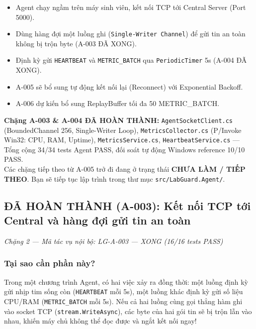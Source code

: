 \documentclass[12pt,a4paper]{article}
\begin{document}
\begin{summarybox}
\begin{itemize}[leftmargin=1.5em, itemsep=1pt]
  \item Agent chạy ngầm trên máy sinh viên, kết nối TCP tới Central Server (Port 5000).
  \item Dùng hàng đợi một luồng ghi (\texttt{Single-Writer Channel}) để gửi tin an toàn không bị trộn byte (A-003 ĐÃ XONG).
  \item Định kỳ gửi \texttt{HEARTBEAT} và \texttt{METRIC\_BATCH} qua \texttt{PeriodicTimer} 5s (A-004 ĐÃ XONG).
  \item A-005 sẽ bổ sung tự động kết nối lại (Reconnect) với Exponential Backoff.
  \item A-006 dự kiến bổ sung ReplayBuffer tối đa 50 METRIC\_BATCH.
\end{itemize}
\end{summarybox}

\begin{importantbox}
\textbf{Chặng A-003 \& A-004 ĐÃ HOÀN THÀNH:} \texttt{AgentSocketClient.cs} (BoundedChannel 256, Single-Writer Loop), \texttt{MetricsCollector.cs} (P/Invoke Win32: CPU, RAM, Uptime), \texttt{MetricsService.cs}, \texttt{HeartbeatService.cs} --- Tổng cộng 34/34 tests Agent PASS, đối soát tự động Windows reference 10/10 PASS.\\
Các chặng tiếp theo từ A-005 trở đi đang ở trạng thái \textbf{CHƯA LÀM / TIẾP THEO}. Bạn sẽ tiếp tục lập trình trong thư mục \texttt{src/LabGuard.Agent/}.
\end{importantbox}

\subsection{ĐÃ HOÀN THÀNH (A-003): Kết nối TCP tới Central và hàng đợi gửi tin an toàn}
{\footnotesize\color{lgGray}\textit{Chặng 2 — Mã tác vụ nội bộ: LG-A-003 — XONG (16/16 tests PASS)}}\par
\vspace{2mm}

\subsubsection{Tại sao cần phần này?}
Trong một chương trình Agent, có hai việc xảy ra đồng thời: một luồng định kỳ gửi nhịp tim sống còn (\texttt{HEARTBEAT} mỗi 5s), một luồng khác định kỳ gửi số liệu CPU/RAM (\texttt{METRIC\_BATCH} mỗi 5s). Nếu cả hai luồng cùng gọi thẳng hàm ghi vào socket TCP (\texttt{stream.WriteAsync}), các byte của hai gói tin sẽ bị trộn lẫn vào nhau, khiến máy chủ không thể đọc được và ngắt kết nối ngay!
\end{document}
